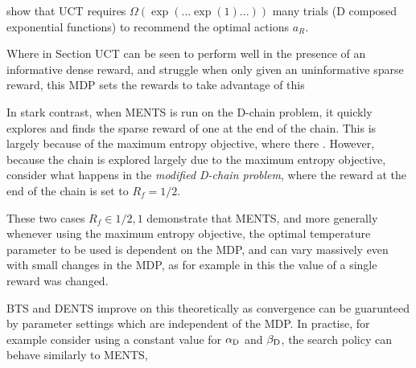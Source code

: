      show that UCT requires $\Omega(\exp(...\exp(1)...))$ many trials (D composed exponential functions) to recommend the optimal actions $a_R$. 

    Where in Section  UCT can be seen to perform well in the presence of an informative dense reward, and struggle when only given an uninformative sparse reward, this MDP sets the rewards to take advantage of this 

    In stark contrast, when MENTS is run on the D-chain problem, it quickly explores and finds the sparse reward of one at the end of the chain. This is largely because of the maximum entropy objective, where there . However, because the chain is explored largely due to the maximum entropy objective, consider what happens in the \textit{modified D-chain problem}, where the reward at the end of the chain is set to $R_f=1/2$. 

    These two cases $R_f \in {1/2,1}$ demonstrate that MENTS, and more generally whenever using the maximum entropy objective, the optimal temperature parameter to be used is dependent on the MDP, and can vary massively even with small changes in the MDP, as for example in this the value of a single reward was changed. 


    BTS and DENTS improve on this theoretically as convergence can be guarunteed by parameter settings which are independent of the MDP. In practise, for example consider using a constant value for ${\alpha_{{\textnormal{D}}}}$ and ${\beta_{{\textnormal{D}}}}$, the search policy can behave similarly to MENTS,  



